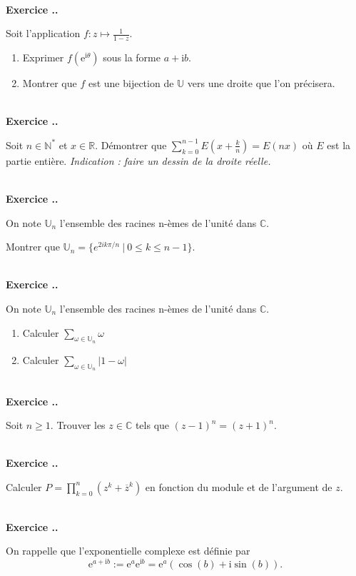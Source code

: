 \documentclass{article}
\newcommand{\mb}[1]{\mathbb{#1}}
\newcounter{exo}
\newcommand{\exercice}[1][\null]{\textbf{\\ \large Exercice \thesection.\theexo. \normalsize #1} \addtocounter{exo}{1}}
\begin{document}
\exercice

Soit l'application $f : z \mapsto \frac{1}{1-z}$.

\begin{enumerate}

\item Exprimer $f(\text{e}^{\text{i}\theta})$ sous la forme $a + \text{i} b$.

\item Montrer que $f$ est une bijection de $\mb{U}$ vers une droite que l'on précisera.

\end{enumerate}

\exercice

Soit $n \in \mb{N^*}$ et $x \in \mb{R}$. Démontrer que $\displaystyle \sum_{k=0}^{n-1} E\left(x + \frac{k}{n}\right) = E(nx)$ où  $E$ est la partie entière. \emph{Indication : faire un dessin de la droite réelle.}



\exercice 
On note $\mathbb{U}_n$ l'ensemble des racines n-èmes de l'unité dans
$\mathbb{C}$.

Montrer que $\mathbb{U}_n = \{ e^{2ik\pi / n} ~|~ 0 \leq k \leq n - 1 \}$.



\exercice

On note $\mathbb{U}_n$ l'ensemble des racines n-èmes de l'unité dans
$\mathbb{C}$.
\begin{enumerate}
    \item Calculer $\sum_{ \omega \in \mathbb{U}_n} \omega$
    \item Calculer $\sum_{ \omega \in \mathbb{U}_n} | 1 - \omega |$
\end{enumerate}




\exercice

Soit $n \ge 1$. Trouver les $z \in \mb{C}$ tels que $(z-1)^n = (z+1)^n$.


\exercice

Calculer $\displaystyle P = \prod_{k=0}^n(z^k + \overline{z}^{k})$ en fonction du module et de l'argument de $z$.




\exercice

On rappelle que l'exponentielle complexe est définie par $$\text{e}^{a+\text{i}b} := \text{e}^{a} \text{e}^{\text{i}b} = \text{e}^{a} (\cos(b) + \text{i} \sin(b)).$$
\end{document}
